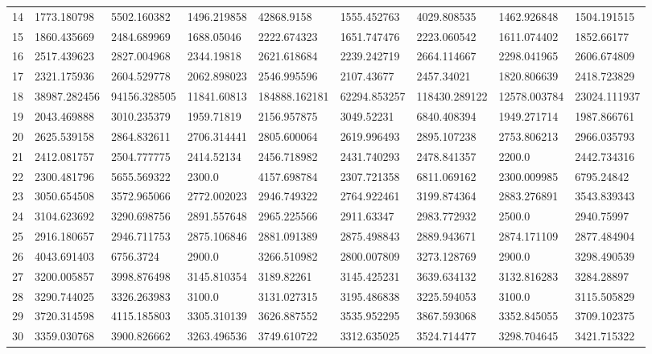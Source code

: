 \begin{table*}[hb!]
\begin{tabular}{|p{0.8cm}|p{1.6cm}|p{1.6cm}|p{1.6cm}|p{1.6cm}|p{1.6cm}|p{1.6cm}|p{1.6cm}|p{1.6cm}|}
14  & 1773.180798 & 5502.160382 & 1496.219858 & 42868.9158 & 1555.452763 & 4029.808535 & 1462.926848 & 1504.191515 \\ 
15  & 1860.435669 & 2484.689969 & 1688.05046 & 2222.674323 & 1651.747476 & 2223.060542 & 1611.074402 & 1852.66177 \\ 
16  & 2517.439623 & 2827.004968 & 2344.19818 & 2621.618684 & 2239.242719 & 2664.114667 & 2298.041965 & 2606.674809 \\ 
17  & 2321.175936 & 2604.529778 & 2062.898023 & 2546.995596 & 2107.43677 & 2457.34021 & 1820.806639 & 2418.723829 \\ 
18  & 38987.282456 & 94156.328505 & 11841.60813 & 184888.162181 & 62294.853257 & 118430.289122 & 12578.003784 & 23024.111937 \\ 
19  & 2043.469888 & 3010.235379 & 1959.71819 & 2156.957875 & 3049.52231 & 6840.408394 & 1949.271714 & 1987.866761 \\ 
20  & 2625.539158 & 2864.832611 & 2706.314441 & 2805.600064 & 2619.996493 & 2895.107238 & 2753.806213 & 2966.035793 \\ 
21  & 2412.081757 & 2504.777775 & 2414.52134 & 2456.718982 & 2431.740293 & 2478.841357 & 2200.0 & 2442.734316 \\ 
22  & 2300.481796 & 5655.569322 & 2300.0 & 4157.698784 & 2307.721358 & 6811.069162 & 2300.009985 & 6795.24842 \\ 
23  & 3050.654508 & 3572.965066 & 2772.002023 & 2946.749322 & 2764.922461 & 3199.874364 & 2883.276891 & 3543.839343 \\ 
24  & 3104.623692 & 3290.698756 & 2891.557648 & 2965.225566 & 2911.63347 & 2983.772932 & 2500.0 & 2940.75997 \\ 
25  & 2916.180657 & 2946.711753 & 2875.106846 & 2881.091389 & 2875.498843 & 2889.943671 & 2874.171109 & 2877.484904 \\ 
26  & 4043.691403 & 6756.3724 & 2900.0 & 3266.510982 & 2800.007809 & 3273.128769 & 2900.0 & 3298.490539 \\ 
27  & 3200.005857 & 3998.876498 & 3145.810354 & 3189.82261 & 3145.425231 & 3639.634132 & 3132.816283 & 3284.28897 \\ 
28  & 3290.744025 & 3326.263983 & 3100.0 & 3131.027315 & 3195.486838 & 3225.594053 & 3100.0 & 3115.505829 \\ 
29  & 3720.314598 & 4115.185803 & 3305.310139 & 3626.887552 & 3535.952295 & 3867.593068 & 3352.845055 & 3709.102375 \\ 
30  & 3359.030768 & 3900.826662 & 3263.496536 & 3749.610722 & 3312.635025 & 3524.714477 & 3298.704645 & 3421.715322 \\ 
\hline
\end{tabular}
\end{table*}
\endgroup


